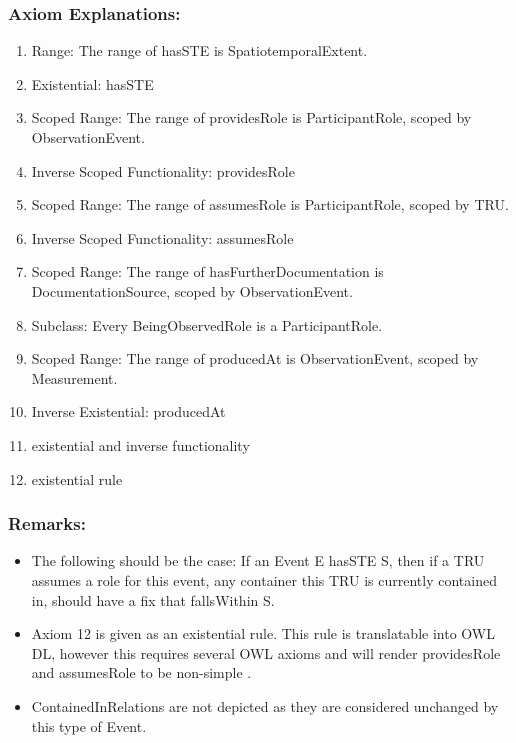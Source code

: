 \subsubsection*{Axiom Explanations:}
\begin{enumerate}
    \item Range: The range of \textsf{hasSTE} is \textsf{SpatiotemporalExtent}.
    \item Existential: \textsf{hasSTE}
    \item Scoped Range: The range of \textsf{providesRole} is \textsf{ParticipantRole}, scoped by \textsf{ObservationEvent}.
    \item Inverse Scoped Functionality: \textsf{providesRole}
    \item Scoped Range: The range of \textsf{assumesRole} is \textsf{ParticipantRole}, scoped by \textsf{TRU}.
    \item Inverse Scoped Functionality: \textsf{assumesRole}
    \item Scoped Range: The range of \textsf{hasFurtherDocumentation} is \textsf{DocumentationSource}, scoped by \textsf{ObservationEvent}.
    \item Subclass: Every \textsf{BeingObservedRole} is a \textsf{ParticipantRole}.
    \item Scoped Range: The range of \textsf{producedAt} is \textsf{ObservationEvent}, scoped by \textsf{Measurement}.
    \item Inverse Existential: \textsf{producedAt}
    \item existential and inverse functionality
    \item existential rule
\end{enumerate}

\subsubsection{Remarks:}
\begin{itemize}
    \item The following should be the case: If an Event E hasSTE S, then if a TRU assumes a role for this event, any container this TRU is currently contained in, should have a fix that fallsWithin S.
    \item Axiom 12 is given as an existential rule. This rule is translatable into OWL DL, however this requires several OWL axioms and will render providesRole and assumesRole to be non-simple \cite{rw2011owlrules}. 
    \item ContainedInRelations are not depicted as they are considered unchanged by this type of Event.
\end{itemize}

